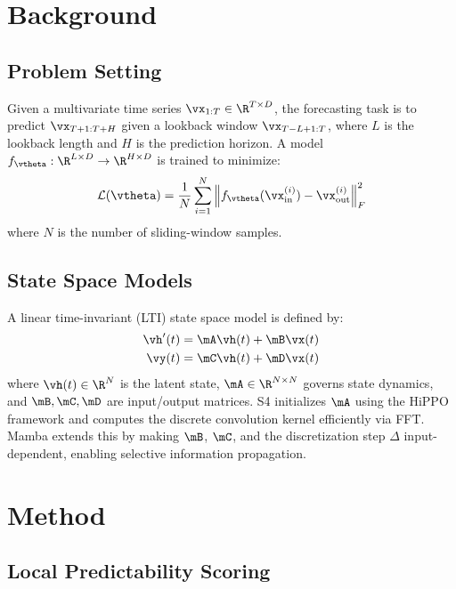 \documentclass[10pt]{article}
\begin{document}
\section{Background}
\label{sec:background}

\subsection{Problem Setting}

Given a multivariate time series $\vx_{1:T} \in \R^{T \times D}$, the forecasting task is to predict $\vx_{T+1:T+H}$ given a lookback window $\vx_{T-L+1:T}$, where $L$ is the lookback length and $H$ is the prediction horizon. A model $f_\vtheta: \R^{L \times D} \to \R^{H \times D}$ is trained to minimize:
\begin{equation}
    \mathcal{L}(\vtheta) = \frac{1}{N} \sum_{i=1}^{N} \left\| f_\vtheta(\vx^{(i)}_{\text{in}}) - \vx^{(i)}_{\text{out}} \right\|^2_F
\end{equation}
where $N$ is the number of sliding-window samples.

\subsection{State Space Models}

A linear time-invariant (LTI) state space model is defined by:
\begin{align}
    \vh'(t) &= \mA \vh(t) + \mB \vx(t) \\
    \vy(t) &= \mC \vh(t) + \mD \vx(t)
\end{align}
where $\vh(t) \in \R^N$ is the latent state, $\mA \in \R^{N \times N}$ governs state dynamics, and $\mB, \mC, \mD$ are input/output matrices. S4 \citep{gu2022efficiently} initializes $\mA$ using the HiPPO framework and computes the discrete convolution kernel efficiently via FFT. Mamba \citep{gu2023mamba} extends this by making $\mB$, $\mC$, and the discretization step $\Delta$ input-dependent, enabling selective information propagation.

\section{Method}
\label{sec:method}

\subsection{Local Predictability Scoring}
\label{sec:predictability}
\end{document}
